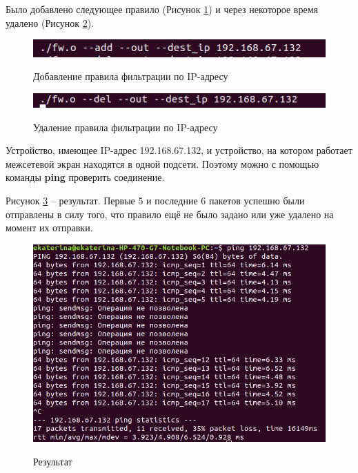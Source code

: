 Было добавлено следующее правило (Рисунок \ref{fig46:image}) и через некоторое время удалено (Рисунок \ref{fig47:image}). 

\begin{figure}[h]
	\begin{center}
		{\includegraphics[scale = 0.6]{img/screenshots/ip/add_rule.png}}
		\caption{Добавление правила фильтрации по IP-адресу}
		\label{fig46:image}
	\end{center}
\end{figure}

\begin{figure}[h]
	\begin{center}
		{\includegraphics[scale = 0.6]{img/screenshots/ip/del_rule.png}}
		\caption{Удаление правила фильтрации по IP-адресу}
		\label{fig47:image}
	\end{center}
\end{figure}

\newpage

Устройство, имеющее IP-адрес 192.168.67.132, и устройство, на котором работает межсетевой экран находятся в одной подсети. Поэтому можно с помощью команды \textbf{ping} проверить соединение.

Рисунок \ref{fig48:image} -- результат. Первые 5 и последние 6 пакетов успешно были отправлены в силу того, что правило ещё не было задано или уже удалено на момент их отправки.
\begin{figure}[h]
	\begin{center}
		{\includegraphics[scale = 0.5]{img/screenshots/ip/result.png}}
		\caption{Результат}
		\label{fig48:image}
	\end{center}
\end{figure}
